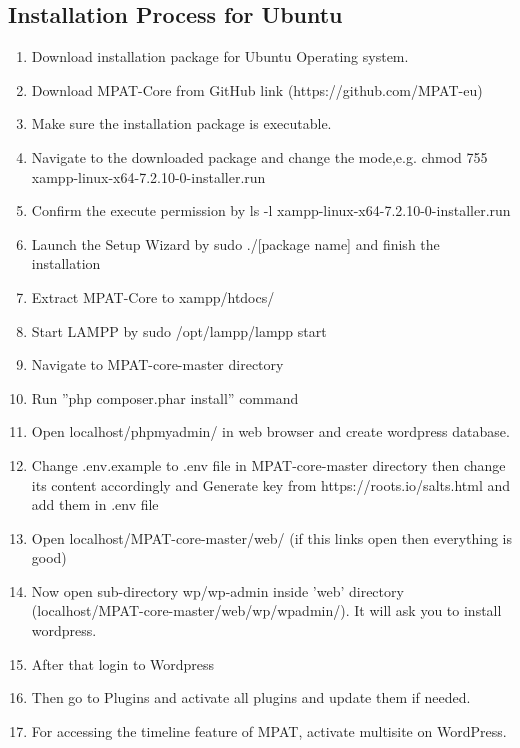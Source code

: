   
 
\subsection{Installation Process for Ubuntu}

\begin{enumerate}
 
\item Download installation package for Ubuntu Operating
system.
\item Download MPAT-Core from GitHub link
(https://github.com/MPAT-eu)
\item Make sure the installation package is executable.
\item Navigate to the downloaded package and change the
mode,e.g.
chmod 755 xampp-linux-x64-7.2.10-0-installer.run
\item Confirm the execute permission by
ls -l xampp-linux-x64-7.2.10-0-installer.run
\item Launch the Setup Wizard by
sudo ./[package name] and finish the installation
\item Extract MPAT-Core to xampp/htdocs/
\item Start LAMPP by
sudo /opt/lampp/lampp start
\item Navigate to MPAT-core-master directory
\item Run ”php composer.phar install” command
\item Open localhost/phpmyadmin/ in web browser and create
wordpress database.
\item Change .env.example to .env file in MPAT-core-master
directory then change its content accordingly and Generate
key from https://roots.io/salts.html and add them
in .env file
\item Open localhost/MPAT-core-master/web/ (if this links
open then everything is good)
\item Now open sub-directory wp/wp-admin inside ’web’
directory (localhost/MPAT-core-master/web/wp/wpadmin/).
It will ask you to install wordpress.
\item After that login to Wordpress
\item Then go to Plugins and activate all plugins and update
them if needed.
\item For accessing the timeline feature of MPAT, activate
multisite on WordPress.
\end{enumerate}






